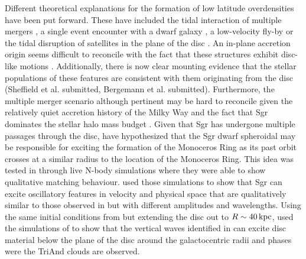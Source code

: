 \documentclass[useAMS,usenatbib]{mnras}
\begin{document}
Different theoretical explanations for the formation of low latitude overdensities have been put forward. These have included the tidal interaction of multiple mergers \citep{kazantzidis08}, a single event encounter with a dwarf galaxy \citep{younger08}, a low-velocity fly-by \citep{gomez15b} or the tidal disruption of satellites in the plane of the disc \citep{penarrubia05,sheffield14}. An in-plane accretion origin seems difficult to reconcile with the fact that these structures exhibit disc-like motions \citep{deboer17}. Additionally, there is now clear mounting evidence that the stellar populations of these features are consistent with them originating from the disc (Sheffield et al. submitted, Bergemann et al. submitted). Furthermore, the multiple merger scenario although pertinent may be hard to reconcile given the relatively quiet accretion history of the Milky Way \citep{ruchti15} and the fact that Sgr dominates the stellar halo mass budget \citep{bell08,ostholt10}. Given that Sgr has undergone multiple passages through the disc, \cite{dansac11} have hypothesized that the Sgr dwarf spheroidal may be responsible for exciting the formation of the Monoceros Ring as its past orbit crosses at a similar radius to the location of the Monoceros Ring. This idea was tested in \cite{purcell11} through live N-body simulations where they were able to show qualitative matching behaviour. \cite{gomez13} used those simulations to show that Sgr can excite oscillatory features in velocity and physical space that are qualitatively similar to those observed in \cite{widrow12} but with different amplitudes and wavelengths. Using the same initial conditions from \cite{purcell11} but extending the disc out to $R\sim40 \,\rm{kpc}$, \cite{price-whelan15} used the simulations of \cite{laporte16} to show that the vertical waves identified in \cite{gomez13} can excite disc material below the plane of the disc around the galactocentric radii and phases were the TriAnd clouds are observed. 
\end{document}

